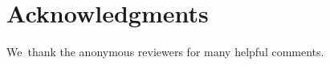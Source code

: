 \documentclass[a4paper, UKenglish, cleveref, autoref,  thm-restate, anonymous]{lipics-v2021}
\DeclareMathOperator{\BA}{BA}
\begin{document}

    \section*{Acknowledgments}
    We~thank the anonymous reviewers for many helpful comments.

    
    
\end{document}
